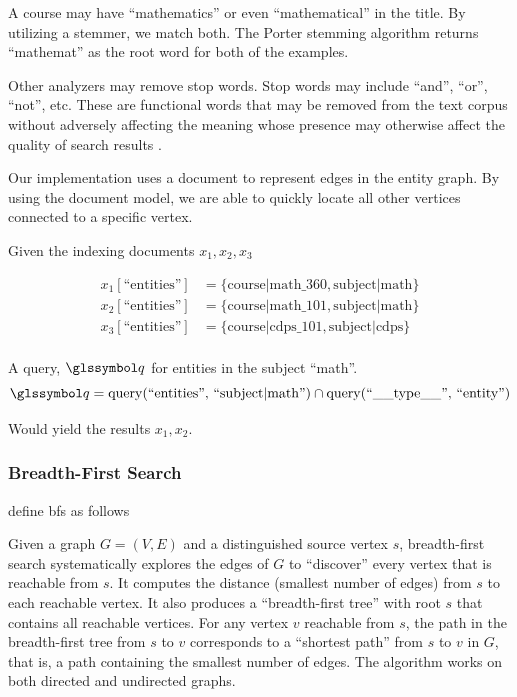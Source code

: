 			\begin{ex}
				A course may have ``mathematics'' or even ``mathematical'' in the title.  By utilizing a stemmer, we match both.  The Porter stemming algorithm returns ``mathemat'' as the root word for both of the examples.
			\end{ex}
			
			Other analyzers may remove stop words.  Stop words may include ``and'', ``or'', ``not'', etc.  These are functional words that may be removed from the text corpus without adversely affecting the meaning whose presence may otherwise affect the quality of search results \cite{silva-03}.
			
			Our implementation uses a document to represent edges in the entity graph.  By using the document model, we are able to quickly locate all other vertices connected to a specific vertex.
			
			\begin{ex}
				Given the indexing documents \(x_1, x_2, x_3\)
				
				\begin{align*}
					x_1[\text{``entities''}] &= \{\text{course|math\_360}, \text{subject|math}\} \\
					x_2[\text{``entities''}] &= \{\text{course|math\_101}, \text{subject|math}\} \\
					x_3[\text{``entities''}] &= \{\text{course|cdps\_101}, \text{subject|cdps}\} \\
				\end{align*}
				
				A query, \(\q\) for entities in the subject ``math''.
				\[
					\q = \query(\text{``entities'', ``subject|math''}) \cap \query(\text{``\_\_type\_\_'', ``entity''})
				\]
				
				Would yield the results \(x_1, x_2\).
			\end{ex}
		
		\subsubsection{Breadth-First Search}
			\citeauthor*{cormen-09} define \gls{bfs} as follows
			
			\begin{displayquote}
				Given a graph \(G = (V, E)\) and a distinguished source vertex \(s\), breadth-first search systematically explores the edges of \(G\) to ``discover'' every vertex that is reachable from \(s\). It computes the distance (smallest number of edges) from \(s\) to each reachable vertex. It also produces a ``breadth-first tree'' with root \(s\) that contains all reachable vertices. For any vertex \(v\) reachable from \(s\), the path in the breadth-first tree from \(s\) to \(v\) corresponds to a ``shortest path'' from \(s\) to \(v\) in \(G\), that is, a path containing the smallest number of edges. The algorithm works on both directed and undirected graphs.
			\end{displayquote}
			
